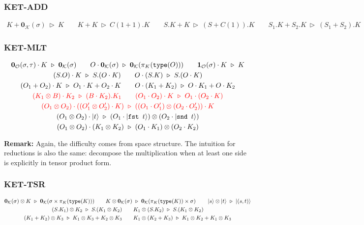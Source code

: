 \documentclass[manuscript, review, timestamp]{acmart}
\newcommand*{\type}{\texttt{type}}
\newcommand*{\fst}{\texttt{fst }}
\newcommand*{\snd}{\texttt{snd }}
\newcommand*{\reduce}{\ \triangleright\ }
\begin{document}
\subsubsection*{\textsf{KET-ADD}}
\begin{gather*}
  K + \textbf{0}_\mathcal{K}(\sigma) \reduce K
  \qquad
  K + K \reduce C(1 + 1).K
  \qquad
  S.K + K \reduce (S + C(1)).K
  \qquad
  S_1.K + S_2.K \reduce (S_1 + S_2).K
\end{gather*}

\subsubsection*{\textsf{KET-MLT}}
\begin{gather*}
  \textbf{0}_\mathcal{O}(\sigma, \tau) \cdot K \reduce \textbf{0}_\mathcal{K}(\sigma)
  \qquad
  O \cdot \mathbf{0}_{\mathcal{K}}(\sigma) \reduce \mathbf{0}_{\mathcal{K}}(\pi_K(\type(O)))
  \qquad
  \textbf{1}_\mathcal{O}(\sigma) \cdot K \reduce K \\
  (S.O) \cdot K \reduce S.(O \cdot K)
  \qquad
  O \cdot (S.K) \reduce S.(O \cdot K) \\
  (O_1 + O_2) \cdot K \reduce O_1 \cdot K + O_2 \cdot K
  \qquad
  O \cdot (K_1 + K_2) \reduce O \cdot K_1 + O \cdot K_2 \\
  \textcolor{red}{ (K_1 \otimes B) \cdot K_2 \reduce (B \cdot K_2).K_1}
  \qquad
  \textcolor{red}{ (O_1 \cdot O_2) \cdot K \reduce O_1 \cdot (O_2 \cdot K)} \\
  \textcolor{red}{ (O_1 \otimes O_2) \cdot ((O_1' \otimes O_2') \cdot K) \reduce ((O_1 \cdot O_1') \otimes (O_2 \cdot O_2')) \cdot K} \\
  (O_1 \otimes O_2) \cdot \ket{t} \reduce (O_1 \cdot \ket{\fst t}) \otimes (O_2 \cdot \ket{\snd t}) \\
  (O_1 \otimes O_2) \cdot (K_1 \otimes K_2) \reduce (O_1 \cdot K_1) \otimes (O_2 \cdot K_2)
\end{gather*}

\textbf{Remark:} Again, the difficulty comes from space structure. The intuition for reductions is also the same: decompose the multiplication when at least one side is explicitly in tensor product form.


\subsubsection*{\textsf{KET-TSR}}
\begin{gather*}
  \mathbf{0}_\mathcal{K}(\sigma) \otimes K \reduce \mathbf{0}_\mathcal{K}(\sigma \times \pi_K(\type(K)))
  \qquad
  K \otimes \mathbf{0}_\mathcal{K}(\sigma) \reduce \mathbf{0}_\mathcal{K}(\pi_K(\type(K)) \times \sigma)
  \qquad
  \ket{s} \otimes \ket{t}\reduce\ket{(s, t)} \\
  (S.K_1) \otimes K_2 \reduce S.(K_1 \otimes K_2)
  \qquad
  K_1 \otimes (S.K_2) \reduce S.(K_1 \otimes K_2) \\
  (K_1 + K_2) \otimes K_3 \reduce K_1 \otimes K_3 + K_2 \otimes K_3
  \qquad
  K_1 \otimes (K_2 + K_3) \reduce K_1 \otimes K_2 + K_1 \otimes K_3
\end{gather*}
\end{document}
